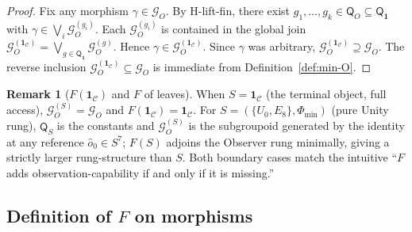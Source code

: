 \documentclass[11pt, a4paper]{amsart}
\theoremstyle{definition}
\newtheorem{remark}[theorem]{Remark}
\newcommand{\catC}{\mathcal{C}}
\newcommand{\Gcal}{\mathcal{G}}
\newcommand{\Qalg}{\mathsf{Q}}
\begin{document}
\begin{proof}
Fix any morphism $\gamma \in \Gcal_O$. By H-lift-fin, there
exist $g_1, \ldots, g_k \in \Qalg_O \subseteq \Qalg_{\mathbf{1}}$
with $\gamma \in \bigvee_i \Gcal_O^{(g_i)}$. Each
$\Gcal_O^{(g_i)}$ is contained in the global join
$\Gcal_O^{(\mathbf{1}_\catC)} = \bigvee_{g \in
\Qalg_{\mathbf{1}}} \Gcal_O^{(g)}$. Hence $\gamma \in
\Gcal_O^{(\mathbf{1}_\catC)}$. Since $\gamma$ was arbitrary,
$\Gcal_O^{(\mathbf{1}_\catC)} \supseteq \Gcal_O$. The reverse
inclusion $\Gcal_O^{(\mathbf{1}_\catC)} \subseteq \Gcal_O$ is
immediate from Definition~\ref{def:min-O}.
\end{proof}

\begin{remark}[$F(\mathbf{1}_\catC)$ and $F$ of leaves]
\label{rmk:idempotence-base}
When $S = \mathbf{1}_\catC$ (the terminal object, full access),
$\Gcal_O^{(S)} = \Gcal_O$ and $F(\mathbf{1}_\catC) =
\mathbf{1}_\catC$. For $S = (\{U_0, E_8\}, \Phi_{\min})$ (pure
Unity rung), $\Qalg_S$ is the constants and $\Gcal_O^{(S)}$ is
the subgroupoid generated by the identity at any reference
$\hat o_0 \in S^7$; $F(S)$ adjoins the Observer rung minimally,
giving a strictly larger rung-structure than $S$. Both boundary
cases match the intuitive ``$F$ adds observation-capability if
and only if it is missing.''
\end{remark}

\subsection{Definition of $F$ on morphisms}
\label{subsec:F-morphisms}
\end{document}
